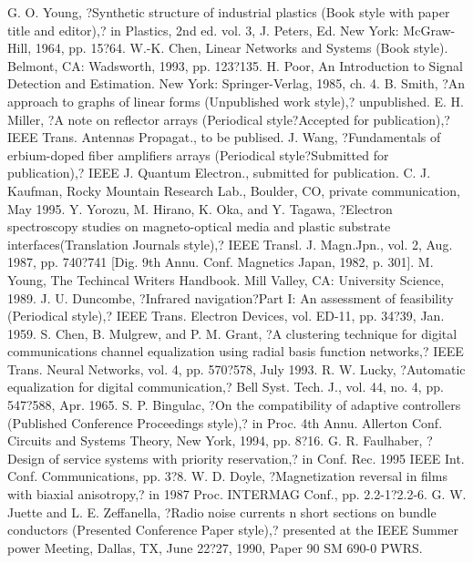 \documentclass[letterpaper, 10 pt, conference]{ieeeconf}  %
\begin{document}
\begin{thebibliography}{99}

 G. O. Young, ?Synthetic structure of industrial plastics (Book style with paper title and editor),? 	in Plastics, 2nd ed. vol. 3, J. Peters, Ed.  New York: McGraw-Hill, 1964, pp. 15?64.
 W.-K. Chen, Linear Networks and Systems (Book style).	Belmont, CA: Wadsworth, 1993, pp. 123?135.
 H. Poor, An Introduction to Signal Detection and Estimation.   New York: Springer-Verlag, 1985, ch. 4.
 B. Smith, ?An approach to graphs of linear forms (Unpublished work style),? unpublished.
 E. H. Miller, ?A note on reflector arrays (Periodical style?Accepted for publication),? IEEE Trans. Antennas Propagat., to be publised.
 J. Wang, ?Fundamentals of erbium-doped fiber amplifiers arrays (Periodical style?Submitted for publication),? IEEE J. Quantum Electron., submitted for publication.
 C. J. Kaufman, Rocky Mountain Research Lab., Boulder, CO, private communication, May 1995.
 Y. Yorozu, M. Hirano, K. Oka, and Y. Tagawa, ?Electron spectroscopy studies on magneto-optical media and plastic substrate interfaces(Translation Journals style),? IEEE Transl. J. Magn.Jpn., vol. 2, Aug. 1987, pp. 740?741 [Dig. 9th Annu. Conf. Magnetics Japan, 1982, p. 301].
 M. Young, The Techincal Writers Handbook.  Mill Valley, CA: University Science, 1989.
 J. U. Duncombe, ?Infrared navigation?Part I: An assessment of feasibility (Periodical style),? IEEE Trans. Electron Devices, vol. ED-11, pp. 34?39, Jan. 1959.
 S. Chen, B. Mulgrew, and P. M. Grant, ?A clustering technique for digital communications channel equalization using radial basis function networks,? IEEE Trans. Neural Networks, vol. 4, pp. 570?578, July 1993.
 R. W. Lucky, ?Automatic equalization for digital communication,? Bell Syst. Tech. J., vol. 44, no. 4, pp. 547?588, Apr. 1965.
 S. P. Bingulac, ?On the compatibility of adaptive controllers (Published Conference Proceedings style),? in Proc. 4th Annu. Allerton Conf. Circuits and Systems Theory, New York, 1994, pp. 8?16.
 G. R. Faulhaber, ?Design of service systems with priority reservation,? in Conf. Rec. 1995 IEEE Int. Conf. Communications, pp. 3?8.
 W. D. Doyle, ?Magnetization reversal in films with biaxial anisotropy,? in 1987 Proc. INTERMAG Conf., pp. 2.2-1?2.2-6.
 G. W. Juette and L. E. Zeffanella, ?Radio noise currents n short sections on bundle conductors (Presented Conference Paper style),? presented at the IEEE Summer power Meeting, Dallas, TX, June 22?27, 1990, Paper 90 SM 690-0 PWRS.

\end{thebibliography}
\end{document}
